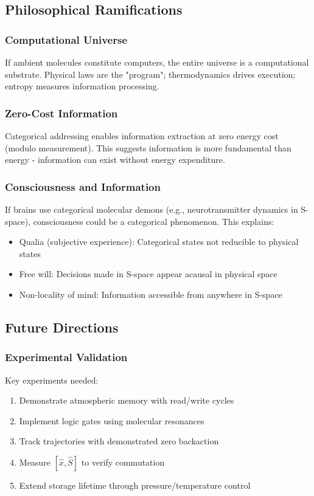 \subsection{Philosophical Ramifications}

\subsubsection{Computational Universe}

If ambient molecules constitute computers, the entire universe is a computational substrate. Physical laws are the "program"; thermodynamics drives execution; entropy measures information processing.

\subsubsection{Zero-Cost Information}

Categorical addressing enables information extraction at zero energy cost (modulo measurement). This suggests information is more fundamental than energy - information can exist without energy expenditure.

\subsubsection{Consciousness and Information}

If brains use categorical molecular demons (e.g., neurotransmitter dynamics in S-space), consciousness could be a categorical phenomenon. This explains:
\begin{itemize}
\item Qualia (subjective experience): Categorical states not reducible to physical states
\item Free will: Decisions made in S-space appear acausal in physical space
\item Non-locality of mind: Information accessible from anywhere in S-space
\end{itemize}

\subsection{Future Directions}

\subsubsection{Experimental Validation}

Key experiments needed:
\begin{enumerate}
\item Demonstrate atmospheric memory with read/write cycles
\item Implement logic gates using molecular resonances
\item Track trajectories with demonstrated zero backaction
\item Measure $[\hat{x}, \hat{S}]$ to verify commutation
\item Extend storage lifetime through pressure/temperature control
\end{enumerate}

